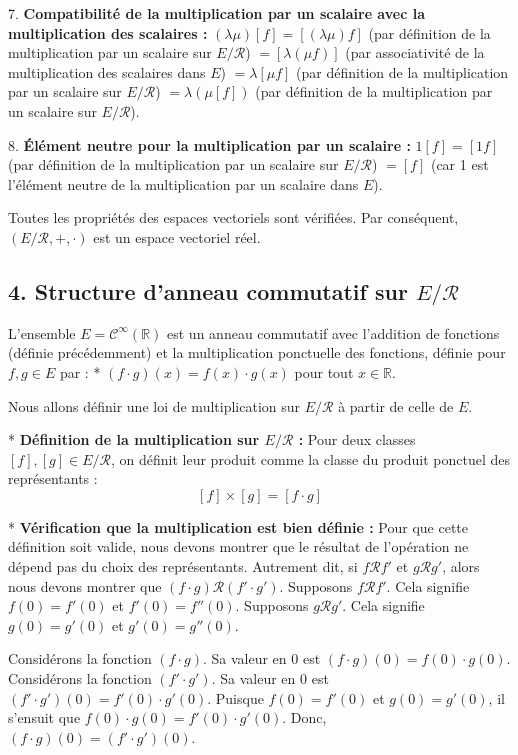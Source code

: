 \documentclass{report}
\begin{document}
    7.  \textbf{Compatibilité de la multiplication par un scalaire avec la multiplication des scalaires :}
        $(\lambda \mu)[f] = [(\lambda \mu)f]$ (par définition de la multiplication par un scalaire sur $E/\mathcal{R}$)
        $= [\lambda (\mu f)]$ (par associativité de la multiplication des scalaires dans $E$)
        $= \lambda [\mu f]$ (par définition de la multiplication par un scalaire sur $E/\mathcal{R}$)
        $= \lambda (\mu[f])$ (par définition de la multiplication par un scalaire sur $E/\mathcal{R}$).

    8.  \textbf{Élément neutre pour la multiplication par un scalaire :}
        $1[f] = [1f]$ (par définition de la multiplication par un scalaire sur $E/\mathcal{R}$)
        $= [f]$ (car 1 est l'élément neutre de la multiplication par un scalaire dans $E$).

Toutes les propriétés des espaces vectoriels sont vérifiées. Par conséquent, $(E/\mathcal{R}, +, \cdot)$ est un espace vectoriel réel.

\subsection*{4. Structure d'anneau commutatif sur $E/\mathcal{R}$}

L'ensemble $E = \mathcal{C}^\infty(\mathbb{R})$ est un anneau commutatif avec l'addition de fonctions (définie précédemment) et la multiplication ponctuelle des fonctions, définie pour $f, g \in E$ par :
*   $(f \cdot g)(x) = f(x) \cdot g(x)$ pour tout $x \in \mathbb{R}$.

Nous allons définir une loi de multiplication sur $E/\mathcal{R}$ à partir de celle de $E$.

*   \textbf{Définition de la multiplication sur $E/\mathcal{R}$ :}
    Pour deux classes $[f], [g] \in E/\mathcal{R}$, on définit leur produit comme la classe du produit ponctuel des représentants :
    $$[f] \times [g] = [f \cdot g]$$

*   \textbf{Vérification que la multiplication est bien définie :}
    Pour que cette définition soit valide, nous devons montrer que le résultat de l'opération ne dépend pas du choix des représentants. Autrement dit, si $f \mathcal{R} f'$ et $g \mathcal{R} g'$, alors nous devons montrer que $(f \cdot g) \mathcal{R} (f' \cdot g')$.
    Supposons $f \mathcal{R} f'$. Cela signifie $f(0) = f'(0)$ et $f'(0) = f''(0)$.
    Supposons $g \mathcal{R} g'$. Cela signifie $g(0) = g'(0)$ et $g'(0) = g''(0)$.

    Considérons la fonction $(f \cdot g)$. Sa valeur en $0$ est $(f \cdot g)(0) = f(0) \cdot g(0)$.
    Considérons la fonction $(f' \cdot g')$. Sa valeur en $0$ est $(f' \cdot g')(0) = f'(0) \cdot g'(0)$.
    Puisque $f(0) = f'(0)$ et $g(0) = g'(0)$, il s'ensuit que $f(0) \cdot g(0) = f'(0) \cdot g'(0)$.
    Donc, $(f \cdot g)(0) = (f' \cdot g')(0)$.
\end{document}
